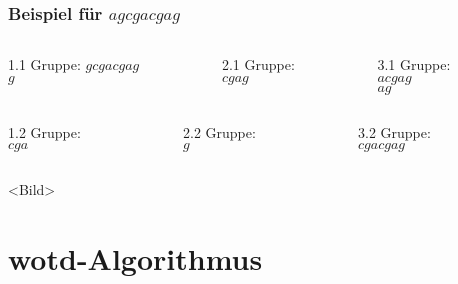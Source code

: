 \documentclass{beamer}
\begin{document}
\begin{frame}[t]
\frametitle{Beispiel für $agcgacgag$}
\begin{columns}
    \begin{column}[t]{0.3\textwidth}
        1.1 Gruppe:  
        $gcgacgag$ \\  
        $g$        \\  
    \end{column}
    \begin{column}[t]{0.3\textwidth}
        2.1 Gruppe: \\
        $cgag$      \\
    \end{column}
    \begin{column}[t]{0.3\textwidth}
        3.1 Gruppe: \\
        $acgag$     \\
        $ag$        \\
    \end{column}
\end{columns}
\medskip
\begin{columns}
    \begin{column}[t]{0.3\textwidth}
        1.2 Gruppe:\\
        $cga$      \\  
    \end{column}
    \begin{column}[t]{0.3\textwidth}
        2.2 Gruppe: \\
        $g$         \\
    \end{column}
    \begin{column}[t]{0.3\textwidth}
        3.2 Gruppe: \\
        $cgacgag$   \\
    \end{column}
\end{columns}
\medskip
<Bild>
\end{frame}


\section{wotd-Algorithmus}
\end{document}
